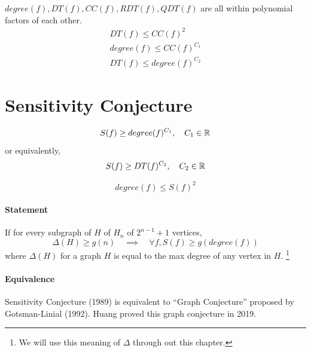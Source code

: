 \begin{theorem} 
	$degree(f), DT(f), CC(f), RDT(f), QDT(f)$ are all within polynomial factors of each other. 
	\begin{equation}
		\begin{aligned}
			DT(f) \leq CC(f)^2 \\
			degree(f) \leq CC(f) ^ {C_1} \\
			DT(f) \leq degree(f) ^ {C_2}
		\end{aligned}
	\end{equation}
\end{theorem}


\section{Sensitivity Conjecture}
\begin{proposition} 
	\begin{equation}
		S(f) \geq degree(f)^{C_1}, \quad C_1 \in \mathbb{R}
	\end{equation} 	
	or equivalently, 
	\begin{equation}
		S(f) \geq DT(f) ^{C_2}, \quad C_2 \in \mathbb{R}
	\end{equation}
\end{proposition}

\begin{theorem}
	\begin{equation}
		degree(f) \leq S(f) ^ 2
	\end{equation}
\end{theorem}

\begin{theorem}
	\paragraph{Statement}
	If for every subgraph of $H$ of $H_n$ of $2^{n - 1} + 1$ vertices, 
	\begin{equation}
		\Delta(H) \geq  g(n) \quad \implies \quad \forall f, S(f) \geq g(degree(f))
	\end{equation}
	where $\Delta (H)$ for a graph $H$ is equal to the max degree of any vertex in $H$. \footnote{We will use this meaning of $\Delta$ through out this chapter.}
	\paragraph{Equivalence}
	Sensitivity Conjecture (1989) is equivalent to ``Graph Conjecture'' proposed by Gotsman-Linial (1992). Huang proved this graph conjecture in 2019. 
\end{theorem}


